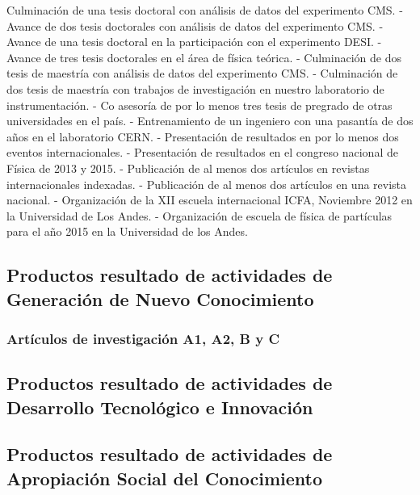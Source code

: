\documentclass{article}
\begin{document}
Culminación de una tesis doctoral con análisis de datos del experimento CMS.
- Avance de dos tesis doctorales con análisis de datos del experimento CMS.
- Avance de una tesis doctoral en la participación con el experimento DESI.
- Avance de tres tesis doctorales en el área de física teórica.
- Culminación de dos tesis de maestría con análisis de datos del experimento CMS.
- Culminación de dos tesis de maestría con trabajos de investigación en nuestro laboratorio de
instrumentación.
- Co asesoría de por lo menos tres tesis de pregrado de otras universidades en el país.
- Entrenamiento de un ingeniero con una pasantía de dos años en el laboratorio CERN.
- Presentación de resultados en por lo menos dos eventos internacionales.
- Presentación de resultados en el congreso nacional de Física de 2013 y 2015.
- Publicación de al menos dos artículos en revistas internacionales indexadas.
- Publicación de al menos dos artículos en una revista nacional.
- Organización de la XII escuela internacional ICFA, Noviembre 2012 en la Universidad de Los
Andes.
- Organización de escuela de física de partículas para el año 2015 en la Universidad de los
Andes.
 
\subsection{Productos resultado de actividades de Generación de Nuevo
  Conocimiento} 

\subsubsection{Art\'iculos de investigaci\'on A1, A2, B y C}

\subsection{Productos resultado de actividades de Desarrollo
  Tecnol\'ogico e Innovaci\'on} 

\subsection{Productos resultado de actividades de Apropiación Social
  del Conocimiento} 
\end{document}
